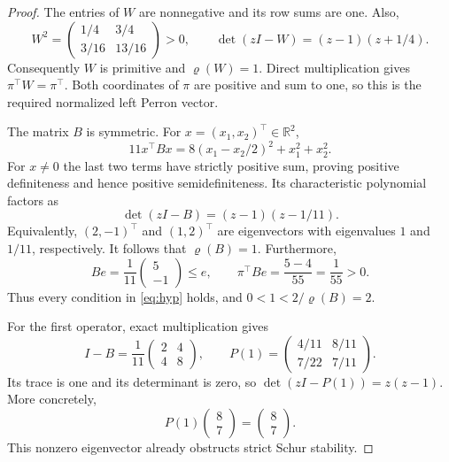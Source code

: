 \documentclass[11pt]{article}
\newcommand{\R}{\mathbb R}
\newcommand{\rhoo}{\varrho}
\begin{document}
\begin{proof}
The entries of $W$ are nonnegative and its row sums are one. Also,
\[
 W^2=\begin{pmatrix}1/4&3/4\\3/16&13/16\end{pmatrix}>0,
 \qquad
 \det(zI-W)=(z-1)(z+1/4).
\]
Consequently $W$ is primitive and $\rhoo(W)=1$. Direct multiplication gives
$\pi^\top W=\pi^\top$. Both coordinates of $\pi$ are positive and sum to
one, so this is the required normalized left Perron vector.

The matrix $B$ is symmetric. For $x=(x_1,x_2)^\top\in\R^2$,
\begin{equation}\label{eq:quadratic}
 11x^\top Bx=8(x_1-x_2/2)^2+x_1^2+x_2^2.
\end{equation}
For $x\ne0$ the last two terms have strictly positive sum, proving positive
definiteness and hence positive semidefiniteness. Its characteristic
polynomial factors as
\[
 \det(zI-B)=(z-1)(z-1/11).
\]
Equivalently, $(2,-1)^\top$ and $(1,2)^\top$ are eigenvectors with eigenvalues
$1$ and $1/11$, respectively. It follows that $\rhoo(B)=1$.
Furthermore,
\[
 Be=\frac1{11}\begin{pmatrix}5\\-1\end{pmatrix}\leq e,
 \qquad
 \pi^\top Be=\frac{5-4}{55}=\frac1{55}>0.
\]
Thus every condition in \eqref{eq:hyp} holds, and $0<1<2/\rhoo(B)=2$.

For the first operator, exact multiplication gives
\begin{equation}\label{eq:P}
 I-B=\frac1{11}\begin{pmatrix}2&4\\4&8\end{pmatrix},\qquad
 P(1)=\begin{pmatrix}4/11&8/11\\7/22&7/11\end{pmatrix}.
\end{equation}
Its trace is one and its determinant is zero, so
$\det(zI-P(1))=z(z-1)$. More concretely,
\[
 P(1)\begin{pmatrix}8\\7\end{pmatrix}
 =\begin{pmatrix}8\\7\end{pmatrix}.
\]
This nonzero eigenvector already obstructs strict Schur stability.


\end{proof}
\end{document}
